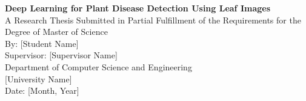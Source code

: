 \documentclass[12pt,a4paper]{report}
\begin{document}
\begin{titlepage}
    \centering
    {\Large \textbf{Deep Learning for Plant Disease Detection Using Leaf Images}}\\[1cm]
    {A Research Thesis Submitted in Partial Fulfillment of the Requirements for the Degree of Master of Science}\\[1cm]
    {By: [Student Name]}\\[0.5cm]
    {Supervisor: [Supervisor Name]}\\[2cm]
    {Department of Computer Science and Engineering}\\
    {[University Name]}\\[1cm]
    {Date: [Month, Year]}\\
\end{titlepage}

\tableofcontents
\listoffigures
\listoftables
\end{document}
